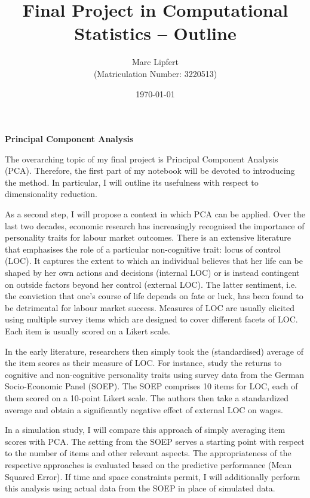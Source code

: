 \documentclass[11pt, a4paper, leqno]{article}
\begin{document}
\title{Final Project in Computational Statistics -- Outline}
\date{\today}
\author{Marc Lipfert \\ (Matriculation Number: 3220513)}
\maketitle

\begin{center}
	\textbf{Principal Component Analysis}
\end{center}

The overarching topic of my final project is Principal Component Analysis (PCA). Therefore, the first part of my notebook will be devoted to introducing the method. In particular, I will outline its usefulness with respect to dimensionality reduction. 

As a second step, I will propose a context in which PCA can be applied. Over the last two decades, economic research has increasingly recognised the importance of personality traits for labour market outcomes. There is an extensive literature that emphasises the role of a particular non-cognitive trait: locus of control (LOC). It captures the extent to which an individual believes that her life can be shaped by her own actions and decisions (internal LOC) or is instead contingent on outside factors beyond her control (external LOC). The latter sentiment, i.e. the conviction that one's course of life depends on fate or luck, has been found to be detrimental for labour market success. Measures of LOC are usually elicited using multiple survey items which are designed to cover different facets of LOC. Each item is usually scored on a Likert scale. 

In the early literature, researchers then simply took the (standardised) average of the item scores as their measure of LOC. For instance, \textcite{heineck2010} study the returns to cognitive and non-cognitive personality traits using survey data from the German Socio-Economic Panel (SOEP). The SOEP comprises 10 items for LOC, each of them scored on a 10-point Likert scale. The authors then take a standardized average and obtain a significantly negative effect of external LOC on wages. 

In a simulation study, I will compare this approach of simply averaging item scores with PCA. The setting from the SOEP serves a starting point with respect to the number of items and other relevant aspects. The appropriateness of the respective approaches is evaluated based on the predictive performance (Mean Squared Error). If time and space constraints permit, I will additionally perform this analysis using actual data from the SOEP in place of simulated data.
\end{document}
